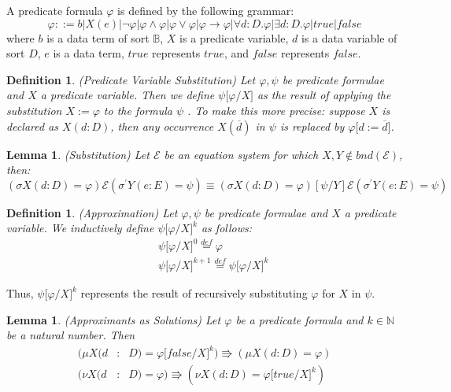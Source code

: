 \documentclass{article}
\newtheorem{definition}[theorem]{Definition}
\newtheorem{lemma}[theorem]{Lemma}
\begin{document}
A predicate formula $\varphi $ is defined by the following grammar:%
\begin{equation*}
\varphi ::=b|X(e)|\lnot \varphi |\varphi \wedge \varphi |\varphi \vee
\varphi |\varphi \rightarrow \varphi |\forall d:D.\varphi |\exists
d:D.\varphi |true |false
\end{equation*}%
where $b$ is a data term of sort $\mathbb{B}$, $X$ is a predicate variable, $%
d$ is a data variable of sort $D$, $e$ is a data term, $true $ represents $%
true$, and $false $ represents $false$.

\begin{definition}
(Predicate Variable Substitution) Let $\varphi ,\psi $ be predicate formulae
and $X$ a predicate variable. Then we define $\psi \lbrack \varphi /X]$ as
the result of applying the substitution $X:=\varphi $ to the formula $\psi $%
. To make this more precise: suppose $X$ is declared as $X(d:D)$, then any
occurrence $X(\overline{d})$ in $\psi $ is replaced by $\varphi \lbrack d:=%
\overline{d}]$.
\end{definition}

\begin{lemma}
(Substitution) Let $\mathcal{E}$ be an equation system for which $X,Y\notin
bnd(\mathcal{E})$, then:%
\begin{equation*}
(\sigma X(d:D)=\varphi )\mathcal{E}(\sigma ^{\prime }Y(e:E)=\psi )\equiv
(\sigma X(d:D)=\varphi )[\psi /Y]\mathcal{E}(\sigma ^{\prime }Y(e:E)=\psi )
\end{equation*}
\end{lemma}

\begin{definition}
(Approximation) Let $\varphi ,\psi $ be predicate formulae and $X$ a
predicate variable. We inductively define $\psi \lbrack \varphi /X]^{k}$ as
follows:%
\begin{eqnarray*}
&&\psi \lbrack \varphi /X]^{0}\overset{def}{=}\varphi \\
&&\psi \lbrack \varphi /X]^{k+1}\overset{def}{=}\psi \lbrack \varphi /X]^{k}
\end{eqnarray*}
\end{definition}

Thus, $\psi \lbrack \varphi /X]^{k}$ represents the result of recursively
substituting $\varphi $ for $X$ in $\psi $.

\begin{lemma}
(Approximants as Solutions) Let $\varphi $ be a predicate formula and $k\in 
\mathbb{N}$ be a natural number. Then%
\begin{eqnarray*}
(\mu X(d &:&D)=\varphi \lbrack false /X]^{k})\Rrightarrow (\mu
X(d:D)=\varphi ) \\
(\nu X(d &:&D)=\varphi )\Rrightarrow (\nu X(d:D)=\varphi \lbrack true
/X]^{k})
\end{eqnarray*}
\end{lemma}
\end{document}
